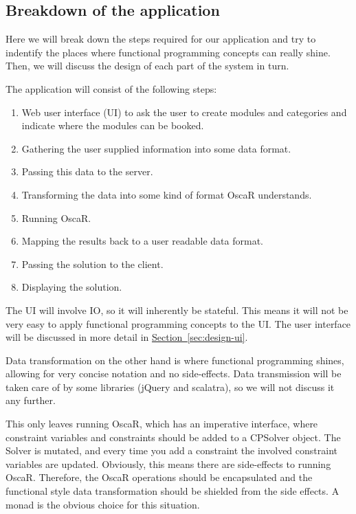 \documentclass[a4paper]{article}
\begin{document}
\subsection{Breakdown of the application}
\label{sec:breakdown}
Here we will break down the steps required for our application and
try to indentify the places where functional programming concepts can really shine.
Then, we will discuss the design of each part of the system in turn.

The application will consist of the following steps:
\begin{enumerate}
	\item Web user interface (UI) to ask the user to create modules and categories
	and indicate where the modules can be booked.
	\item Gathering the user supplied information into some data format.
	\item Passing this data to the server.
	\item Transforming the data into some kind of format OscaR understands.
	\item Running OscaR.
	\item Mapping the results back to a user readable data format.
	\item Passing the solution to the client.
	\item Displaying the solution.
\end{enumerate}
The UI will involve IO, so it will inherently be stateful.
This means it will not be very easy to apply functional programming concepts to the UI.
The user interface will be discussed in more detail in 
\hyperref[sec:design-ui]{Section~\ref*{sec:design-ui}}.

Data transformation on the other hand is where functional programming shines,
allowing for very concise notation and no side-effects.
Data transmission will be taken care of by some libraries (jQuery and scalatra), 
so we will not discuss it any further.

This only leaves running OscaR, which has an imperative interface, 
where constraint variables and constraints should be added to a CPSolver object.
The Solver is mutated, and every time you add a constraint 
the involved constraint variables are updated.
Obviously, this means there are side-effects to running OscaR.
Therefore, the OscaR operations should be encapsulated and the functional style data
transformation should be shielded from the side effects.
A monad is the obvious choice for this situation.


\end{document}
